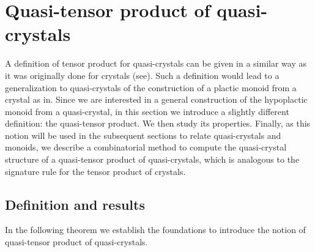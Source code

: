 \documentclass[a4paper,reqno]{amsart}
\numberwithin{equation}{section}
\theoremstyle{plain}
\theoremstyle{definition}
\theoremstyle{remark}
\newcommand*{\avoidcitebreak}{\nolinebreak[3] }  %
\begin{document}
\section{Quasi-tensor product of quasi-crystals}
\label{sec:qcqtp}

A definition of tensor product for quasi-crystals can be given in a similar way as it was originally done for crystals (see\avoidcitebreak \cite{Kas90,Kas91,KN94}).
Such a definition would lead to a generalization to quasi-crystals of the construction of a plactic monoid from a crystal as in\avoidcitebreak \cite[Ch.~5]{Gui22}.
Since we are interested in a general construction of the hypoplactic monoid from a quasi-crystal, in this section we introduce a slightly different definition: the quasi-tensor product.
We then study its properties.
Finally, as this notion will be used in the subsequent sections to relate quasi-crystals and monoids, we describe a combinatorial method to compute the quasi-crystal structure of a quasi-tensor product of quasi-crystals, which is analogous to the signature rule for the tensor product of crystals.



\subsection{Definition and results}
\label{subsec:qcqtpdfnres}

In the following theorem we establish the foundations to introduce the notion of quasi-tensor product of quasi-crystals.
\end{document}
